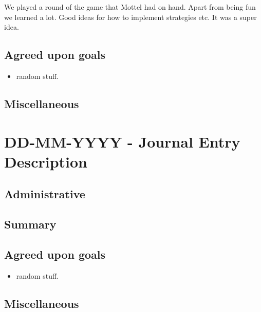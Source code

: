 \documentclass[12pt]{article}
\begin{document}
We played a round of the game that Mottel had on hand. Apart from being fun we learned a lot. Good ideas for how to implement strategies etc. It was a super idea.


\subsection{Agreed upon goals}
\begin{itemize}
\item random stuff.
\end{itemize}

\subsection{Miscellaneous}

\pagebreak

\section{DD-MM-YYYY - Journal Entry Description}

\subsection{Administrative}

\subsection{Summary}

\subsection{Agreed upon goals}
\begin{itemize}
\item random stuff.
\end{itemize}

\subsection{Miscellaneous}

\pagebreak
\end{document}
